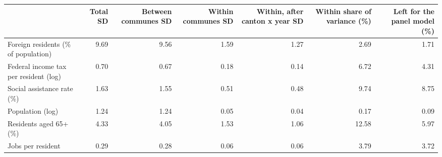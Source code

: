 \begin{tabular}{lrrrrrr}
\toprule
 & Total SD & Between communes SD & Within communes SD & Within, after canton x year SD & Within share of variance (\%) & Left for the panel model (\%) \\
\midrule
Foreign residents (\% of population) & 9.69 & 9.56 & 1.59 & 1.27 & 2.69 & 1.71 \\
Federal income tax per resident (log) & 0.70 & 0.67 & 0.18 & 0.14 & 6.72 & 4.31 \\
Social assistance rate (\%) & 1.63 & 1.55 & 0.51 & 0.48 & 9.74 & 8.75 \\
Population (log) & 1.24 & 1.24 & 0.05 & 0.04 & 0.17 & 0.09 \\
Residents aged 65+ (\%) & 4.33 & 4.05 & 1.53 & 1.06 & 12.58 & 5.97 \\
Jobs per resident & 0.29 & 0.28 & 0.06 & 0.06 & 3.79 & 3.72 \\
\bottomrule
\end{tabular}
